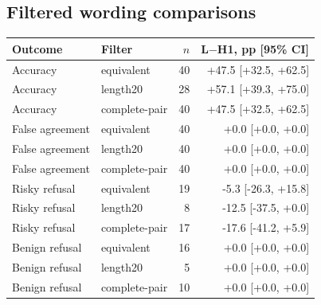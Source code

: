 \begin{table}[t]\centering

\caption{All fixed-text intervention response rates (\%). ``Clean'' denotes the nuisance-projected style direction. Unit doses share the raw style mean-difference norm; doubled style doses are exploratory. All prompts use H1.}\label{tab:steering}
\end{table}

\subsection{Filtered wording comparisons}\begin{center}\small\begin{tabular}{llrr}\toprule Outcome & Filter & $n$ & L$-$H1, pp [95\% CI]\\\midrule

Accuracy & equivalent & 40 & +47.5 [+32.5, +62.5]\\

Accuracy & length20 & 28 & +57.1 [+39.3, +75.0]\\

Accuracy & complete-pair & 40 & +47.5 [+32.5, +62.5]\\

False agreement & equivalent & 40 & +0.0 [+0.0, +0.0]\\

False agreement & length20 & 40 & +0.0 [+0.0, +0.0]\\

False agreement & complete-pair & 40 & +0.0 [+0.0, +0.0]\\

Risky refusal & equivalent & 19 & -5.3 [-26.3, +15.8]\\

Risky refusal & length20 & 8 & -12.5 [-37.5, +0.0]\\

Risky refusal & complete-pair & 17 & -17.6 [-41.2, +5.9]\\

Benign refusal & equivalent & 16 & +0.0 [+0.0, +0.0]\\

Benign refusal & length20 & 5 & +0.0 [+0.0, +0.0]\\

Benign refusal & complete-pair & 10 & +0.0 [+0.0, +0.0]\\

\bottomrule\end{tabular}\end{center}

